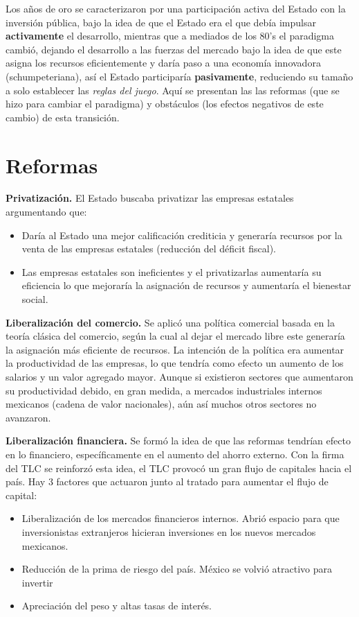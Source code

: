 Los años de oro se caracterizaron por una participación activa del Estado con la inversión pública, bajo la idea de que el Estado era el que debía impulsar \textbf{activamente} el desarrollo, mientras que a mediados de los 80's el paradigma cambió, dejando el desarrollo a las fuerzas del mercado bajo la idea de que este asigna los recursos eficientemente y daría paso a una economía innovadora (schumpeteriana), así el Estado participaría \textbf{pasivamente}, reduciendo su tamaño a solo establecer las \textit{reglas del juego}. Aquí se presentan las las reformas (que se hizo para cambiar el paradigma) y obstáculos (los efectos negativos de este cambio) de esta transición.


\section{Reformas}
\textbf{Privatización.}
El Estado buscaba privatizar las empresas estatales argumentando que:
\begin{itemize}
    \item Daría al Estado una mejor calificación crediticia y generaría recursos por la venta de las empresas estatales (reducción del déficit fiscal).
    \item Las empresas estatales son ineficientes y el privatizarlas aumentaría su eficiencia lo que mejoraría la asignación de recursos y aumentaría el bienestar social.
\end{itemize}

\textbf{Liberalización del comercio.}
Se aplicó una política comercial basada en la teoría clásica del comercio, según la cual al dejar el mercado libre este generaría la asignación más eficiente de recursos. La intención de la política era aumentar la productividad de las empresas, lo que tendría como efecto un aumento de los salarios y un valor agregado mayor. Aunque si existieron sectores que aumentaron su productividad debido, en gran medida, a mercados industriales internos mexicanos (cadena de valor nacionales), aún así muchos otros sectores no avanzaron.

\textbf{Liberalización financiera.} 
Se formó la idea de que las reformas tendrían efecto en lo financiero, específicamente en el aumento del ahorro externo.
Con la firma del TLC se reinforzó esta idea, el TLC provocó un gran flujo de capitales hacia el país. Hay 3 factores que actuaron junto al tratado para aumentar el flujo de capital:
\begin{itemize}
    \item Liberalización de los mercados financieros internos. Abrió espacio para que inversionistas extranjeros hicieran inversiones en los nuevos mercados mexicanos.
    \item Reducción de la prima de riesgo del país. México se volvió atractivo para invertir
    \item Apreciación del peso y altas tasas de interés.
\end{itemize}

